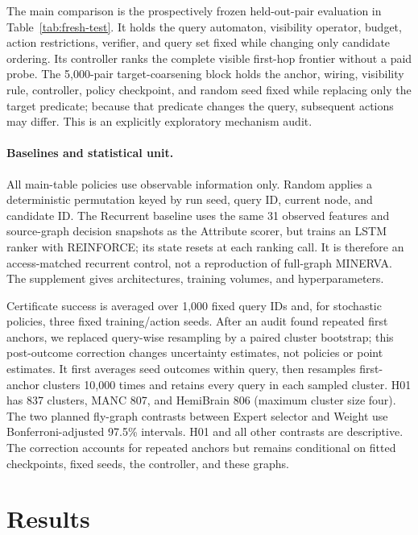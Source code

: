 \documentclass{article}
\begin{document}
The main comparison is the prospectively frozen held-out-pair evaluation in
Table~\ref{tab:fresh-test}. It holds the query automaton, visibility operator,
budget, action restrictions, verifier, and query set fixed while changing only
candidate ordering. Its controller ranks the complete visible first-hop frontier
without a paid probe. The 5,000-pair target-coarsening block holds the anchor, wiring, visibility
rule, controller, policy checkpoint, and random seed fixed while replacing only
the target predicate; because that predicate changes the query, subsequent
actions may differ. This is an explicitly exploratory mechanism audit.

\paragraph{Baselines and statistical unit.}
All main-table policies use observable information only. Random applies a
deterministic permutation keyed by run seed, query ID, current node, and candidate
ID. The Recurrent baseline uses the same 31 observed features and
source-graph decision snapshots as the Attribute scorer, but trains an LSTM ranker
with REINFORCE; its state resets at each ranking call. It is therefore an
access-matched recurrent control, not a reproduction of full-graph MINERVA.
The supplement gives architectures, training volumes, and hyperparameters.

Certificate success is averaged over 1,000 fixed query IDs and, for stochastic
policies, three fixed training/action seeds. After an audit found repeated first
anchors, we replaced query-wise resampling by a paired cluster bootstrap; this
post-outcome correction changes uncertainty estimates, not policies or point estimates. It first
averages seed outcomes within query, then resamples first-anchor clusters 10,000
times and retains every query in each sampled cluster. H01 has 837 clusters,
MANC 807, and HemiBrain 806 (maximum cluster size four). The two planned
fly-graph contrasts between Expert selector and Weight use Bonferroni-adjusted 97.5\%
intervals. H01 and all other contrasts are descriptive. The correction accounts
for repeated anchors but remains conditional on fitted checkpoints, fixed seeds,
the controller, and these graphs.




\section{Results}
\label{sec:results}
\end{document}
